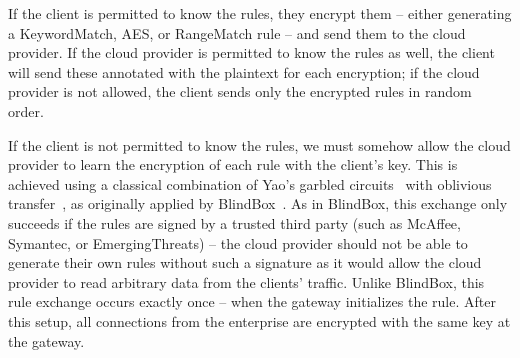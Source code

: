 If the client is permitted to know the rules, they encrypt them -- either generating a KeywordMatch, AES, or RangeMatch rule -- and send them to the cloud provider. If the cloud provider is permitted to know the rules as well, the client will send these annotated with the plaintext for each encryption; if the cloud provider is not allowed, the client sends only the encrypted rules in random order.

If the client is not permitted to know the rules, we must somehow allow the cloud provider to learn the encryption of each rule with the client's key. This is achieved using a classical combination of Yao's garbled circuits~\cite{Yao86} with oblivious transfer~\cite{Naor-Pinkas}, as originally applied by BlindBox~\cite{blindbox}.
As in BlindBox, this exchange only succeeds if the rules are signed by a trusted third party (such as McAffee, Symantec, or EmergingThreats) -- the cloud provider should not be able to generate their own rules without such a signature as it would allow the cloud provider to read arbitrary data from the clients' traffic.
Unlike BlindBox, this rule exchange occurs exactly once -- when the gateway initializes the rule. 
After this setup, all connections from the enterprise are encrypted with the same key at the gateway.

